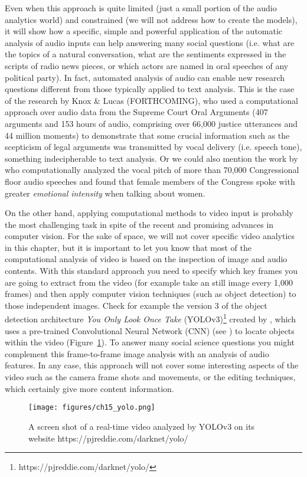 Even when this approach is quite limited (just a small portion of the audio analytics world) and constrained (we will not address how to create the models), it will show how a specific, simple and powerful application of the automatic analysis of audio inputs can help answering many social questions (i.e. what are the topics of a natural conversation, what are the sentiments expressed in the scripts of radio news pieces, or which actors are named in oral speeches of any political party). In fact, automated analysis of audio can enable new research questions different from those typically applied to text analysis. This is the case of the research by Knox \& Lucas (FORTHCOMING), who used a computational approach over audio data from the Supreme Court Oral Arguments (407 arguments and 153 hours of audio, comprising over 66,000 justice utterances and 44 million moments) to demonstrate that some crucial information such as the scepticism of legal arguments was transmitted by vocal delivery (i.e. speech tone), something indecipherable to text analysis. Or we could also mention the work by \cite{dietrich2019pitch} who computationally analyzed the vocal pitch of more than 70,000 Congressional floor audio speeches and found that female members of the Congress spoke with greater \textit{emotional intensity} when talking about women.

On the other hand, applying computational methods to video input is probably the most challenging task in spite of the recent and promising advances in computer vision. For the sake of space, we will not cover specific video analytics in this chapter, but it is important to let you know that most of the computational analysis of video is based on the inspection of image and audio contents. With this standard approach you need to specify which key frames you are going to extract from the video (for example take an still image every 1,000 frames) and then apply computer vision techniques (such as object detection) to those independent images. Check for example the version 3 of the object detection architecture \textit{You Only Look Once Take} (YOLOv3)\footnote{https://pjreddie.com/darknet/yolo/} created by \citet{yolov3}, which uses a pre-trained Convolutional Neural Network (CNN) (see ) to locate objects within the video (Figure~\ref{fig:yolo}). To answer many social science questions you might complement this frame-to-frame image analysis with an analysis of audio features. In any case, this approach will not cover some interesting aspects of the video such as the camera frame shots and movements, or the editing techniques, which certainly give more content information.

\begin{figure}
\centering
\texttt{[image: figures/ch15\_yolo.png]}
\caption{A screen shot of a real-time video analyzed by YOLOv3 on its website https://pjreddie.com/darknet/yolo/}
\label{fig:yolo}
\end{figure}

